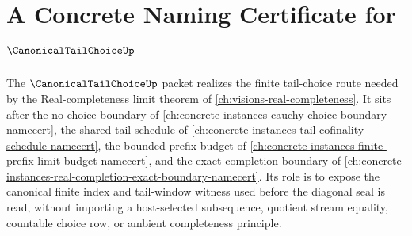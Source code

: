 \chapter{A Concrete Naming Certificate for $\CanonicalTailChoiceUp$}
\label{ch:concrete-instances-canonical-tail-choice-namecert}

The $\CanonicalTailChoiceUp$ packet realizes the finite tail-choice route needed by the Real-completeness limit theorem of \autoref{ch:visions-real-completeness}. It sits after the no-choice boundary of \autoref{ch:concrete-instances-cauchy-choice-boundary-namecert}, the shared tail schedule of \autoref{ch:concrete-instances-tail-cofinality-schedule-namecert}, the bounded prefix budget of \autoref{ch:concrete-instances-finite-prefix-limit-budget-namecert}, and the exact completion boundary of \autoref{ch:concrete-instances-real-completion-exact-boundary-namecert}. Its role is to expose the canonical finite index and tail-window witness used before the diagonal seal is read, without importing a host-selected subsequence, quotient stream equality, countable choice row, or ambient completeness principle.



